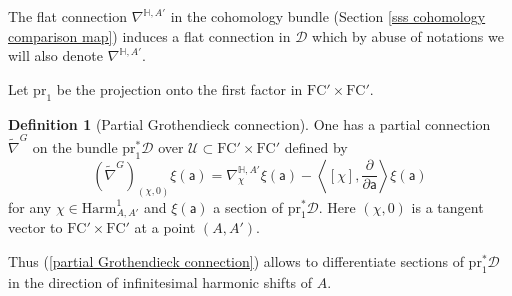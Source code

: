 \documentclass[11pt,a4paper]{amsart}
\theoremstyle{plain} %
\theoremstyle{definition}
\newtheorem{defn}[thm]{Definition}
\theoremstyle{remark}
\newcommand{\Sym}{\operatorname{Sym}}
\newcommand{\mr}{\mathrm}
\newcommand{\sfa}{\mathsf{a}}
\newcommand{\wh}{\widehat}
\newcommand{\til}{\widetilde}
\newcommand{\mc}{\mathcal}
\newcommand{\FC}{\mathrm{FC}}
\begin{document}
{The flat connection $\nabla^{\mathbb{H},A'}$ in the cohomology bundle (Section \ref{sss cohomology comparison map}) induces a flat connection in $\mc{D}$ which by abuse of notations we will also denote $\nabla^{\mathbb{H},A'}$.

Let $\mr{pr}_1$ be the projection onto the first factor in $\FC'\times \FC'$.

\begin{defn}[Partial Grothendieck connection]\label{def: partial Grothendieck connection}
One has a partial connection $\til{\nabla}^G$ on the bundle $\mr{pr}_1^* \mc{D}$ over $\mc{U}\subset \FC'\times \FC'$ defined by 
\begin{equation}\label{partial Grothendieck connection}
    (\til{\nabla}^G)_{(\chi,0)}\xi(\sfa)=\nabla^{\mathbb{H},A'}_\chi\xi(\sfa) -\left\langle [\chi],\frac{\partial}{\partial\sfa} \right\rangle\xi(\sfa)
\end{equation}
for any $\chi\in \mr{Harm}^1_{A,A'}$ and $\xi(\sfa)$ a section  of $\mr{pr}_1^* \mc{D}$.
Here $(\chi,0)$ is a tangent vector to $\FC'\times \FC'$ at a point $(A,A')$. 




Thus (\ref{partial Grothendieck connection}) allows to differentiate sections of $\mr{pr}_1^* \mc{D}$ in the direction of infinitesimal harmonic shifts of $A$.
\end{defn}

}
\end{document}

